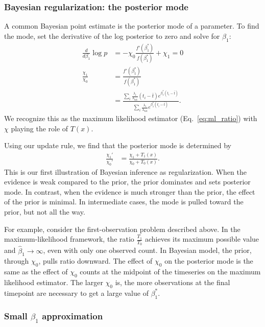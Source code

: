\documentclass[12pt, letterpaper]{article}
\newcommand{ \lambtot }{\lambda_{\text{tot}}}
\begin{document}
\subsubsection{Bayesian regularization: the posterior mode}

A common Bayesian point estimate is the posterior mode of a parameter.
To find the mode, set the derivative of the log posterior to zero and solve for $\beta_1$:
\begin{align}
    \frac{d}{d \beta_1} \log p & = - \chi_0 \frac{f'(\beta_1^*)}{f(\beta_1^*)} + \chi_1 = 0 \\
    \frac{\chi_1}{\chi_0} & =
        \frac{f'(\beta_1^*)}{f(\beta_1^*)} \\
                          & =
    \frac
        {\sum_i \frac{\lambda_i}{\lambtot} (t_i - \bar{t}) e^{\beta_1^* (t_i - \bar{t})}}
        {\sum_i \frac{\lambda_i}{\lambtot} e^{\beta_1^* (t_i - \bar{t})}}.
\end{align}
We recognize this as the maximum likelihood estimator (Eq.~\ref{eq:ml_ratio}) with $\chi$ playing the role of $T(x)$.

Using our update rule, we find that the posterior mode is determined by
\begin{align}
    \frac{\chi_1'}{\chi_0'} & = \frac{\chi_1 + T_1(x)}{\chi_0 + T_0(x)}.
\end{align}
This is our first illustration of Bayesian inference as regularization.
When the evidence is weak compared to the prior, the prior dominates and sets posterior mode.
In contrast, when the evidence is much stronger than the prior, the effect of the prior is minimal.
In intermediate cases, the mode is pulled toward the prior, but not all the way.

For example, consider the first-observation problem described above.
In the maximum-likelihood framework, the ratio $\frac{T_1}{T_0}$ achieves its maximum possible value and $\hat{\beta}_1 \to \infty$, even with only one observed count.
In Bayesian model, the prior, through $\chi_0$, pulls ratio downward.
The effect of $\chi_0$ on the posterior mode is the same as the effect of $\chi_0$ counts at the midpoint of the timeseries on the maximum likelihood estimator.
The larger $\chi_0$ is, the more observations at the final timepoint are necessary to get a large value of $\beta_1^*$.

\subsubsection{Small $\beta_1$ approximation}
\end{document}
